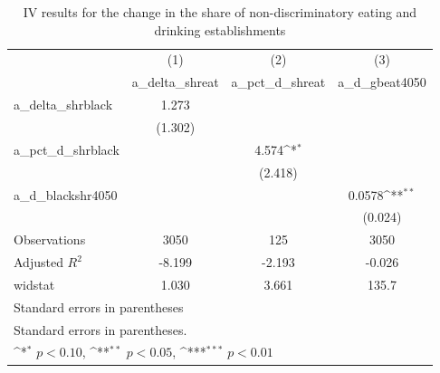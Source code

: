 \begin{table}[htbp]\centering
\def\sym#1{\ifmmode^{#1}\else\(^{#1}\)\fi}
\caption{IV results for the change in the share of non-discriminatory eating and drinking establishments}
\begin{tabular}{l*{3}{c}}
\hline\hline
                    &\multicolumn{1}{c}{(1)}&\multicolumn{1}{c}{(2)}&\multicolumn{1}{c}{(3)}\\
                    &\multicolumn{1}{c}{a\_delta\_shreat}&\multicolumn{1}{c}{a\_pct\_d\_shreat}&\multicolumn{1}{c}{a\_d\_gbeat4050}\\
\hline
a\_delta\_shrblack    &       1.273         &                     &                     \\
                    &     (1.302)         &                     &                     \\
[1em]
a\_pct\_d\_shrblack    &                     &       4.574\sym{*}  &                     \\
                    &                     &     (2.418)         &                     \\
[1em]
a\_d\_blackshr4050    &                     &                     &      0.0578\sym{**} \\
                    &                     &                     &     (0.024)         \\
\hline
Observations        &        3050         &         125         &        3050         \\
Adjusted \(R^{2}\)  &      -8.199         &      -2.193         &      -0.026         \\
widstat             &       1.030         &       3.661         &       135.7         \\
\hline\hline
\multicolumn{4}{l}{\footnotesize Standard errors in parentheses}\\
\multicolumn{4}{l}{\footnotesize Standard errors in parentheses.}\\
\multicolumn{4}{l}{\footnotesize \sym{*} \(p<0.10\), \sym{**} \(p<0.05\), \sym{***} \(p<0.01\)}\\
\end{tabular}
\end{table}
